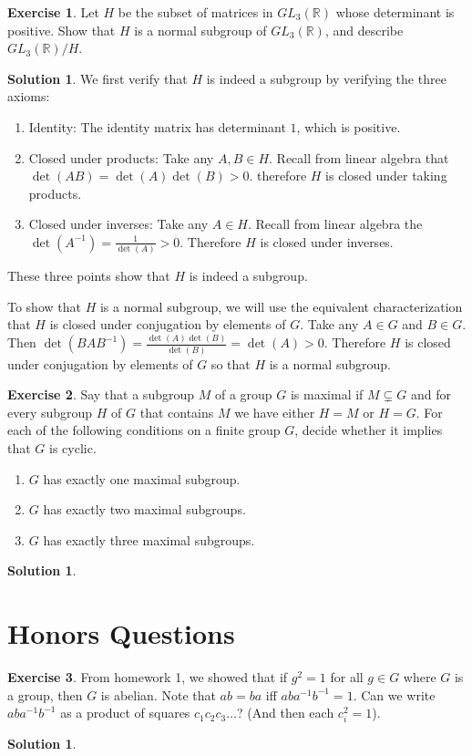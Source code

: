 \documentclass[12pt]{article}
\theoremstyle{definition}
\newtheorem{exercise}{Exercise}
\theoremstyle{definition}
\newtheorem{solution}[theorem]{Solution}
\newcommand{\R}{\mathbb{R}}
\begin{document}
\begin{exercise}
Let $H$ be the subset of matrices in $GL_3(\R)$ whose determinant is positive. Show that $H$ is a normal subgroup of $GL_3(\R)$, and describe $GL_3(\R) / H$.
\end{exercise}
\begin{solution}
We first verify that $H$ is indeed a subgroup by verifying the three axioms:
\begin{enumerate}
	\item Identity: The identity matrix has determinant $1$, which is positive. 
	\item Closed under products: Take any $A, B \in H$. Recall from linear algebra that $\det(AB) = \det(A)\det(B) > 0$. therefore $H$ is closed under taking products. 
	\item Closed under inverses: Take any $A \in H$. Recall from linear algebra the $\det(A^{-1}) = \frac{1}{\det(A)} > 0$. Therefore $H$ is closed under inverses. 
\end{enumerate}
These three points show that $H$ is indeed a subgroup. 

To show that $H$ is a normal subgroup, we will use the equivalent characterization that $H$ is closed under conjugation by elements of $G$. Take any $A \in G$ and $B \in G$. Then $\det(BAB^{-1}) = \frac{\det(A)\det(B)}{\det(B)} = \det(A) > 0$. Therefore $H$ is closed under conjugation by elements of $G$ so that $H$ is a normal subgroup.   
\end{solution}	

\begin{exercise}
Say that a subgroup $M$ of a group $G$ is maximal if $M \subsetneq G$ and for every subgroup $H$ of $G$ that contains $M$ we have either $H = M$ or $H = G$. For each of the following conditions on a finite group $G$, decide whether it implies that $G$ is cyclic.
\begin{enumerate}
	\item $G$ has exactly one maximal subgroup.
	\item $G$ has exactly two maximal subgroups. 
	\item $G$ has exactly three maximal subgroups. 
\end{enumerate} 
\end{exercise}
\begin{solution}

\end{solution}

\section{Honors Questions}
\begin{exercise}
From homework 1, we showed that if $g^2 = 1$ for all $g \in G$ where $G$ is a group, then $G$ is abelian. Note that $ab = ba$ iff $aba^{-1}b^{-1} = 1$. Can we write $aba^{-1}b^{-1}$ as a product of squares $c_1 c_2 c_3 \ldots $? (And then each $c^2_i = 1$).
\end{exercise}
\begin{solution}

\end{solution}
\end{document}
